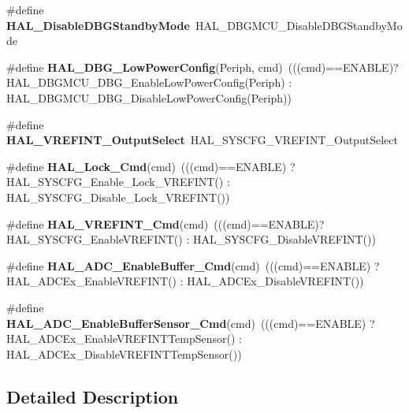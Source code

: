 \begin{DoxyCompactItemize}
\#define {\bfseries H\+A\+L\+\_\+\+Disable\+D\+B\+G\+Standby\+Mode}~H\+A\+L\+\_\+\+D\+B\+G\+M\+C\+U\+\_\+\+Disable\+D\+B\+G\+Standby\+Mode
\item 
\mbox{\label{group___h_a_l___aliased___functions_gaeece8fd3268534ce330c635222ce79a3}} 
\#define {\bfseries H\+A\+L\+\_\+\+D\+B\+G\+\_\+\+Low\+Power\+Config}(Periph,  cmd)~(((cmd)==E\+N\+A\+B\+LE)? H\+A\+L\+\_\+\+D\+B\+G\+M\+C\+U\+\_\+\+D\+B\+G\+\_\+\+Enable\+Low\+Power\+Config(Periph) \+: H\+A\+L\+\_\+\+D\+B\+G\+M\+C\+U\+\_\+\+D\+B\+G\+\_\+\+Disable\+Low\+Power\+Config(Periph))
\item 
\mbox{\label{group___h_a_l___aliased___functions_ga2c3d2cdc9071cfc99696e78c29621852}} 
\#define {\bfseries H\+A\+L\+\_\+\+V\+R\+E\+F\+I\+N\+T\+\_\+\+Output\+Select}~H\+A\+L\+\_\+\+S\+Y\+S\+C\+F\+G\+\_\+\+V\+R\+E\+F\+I\+N\+T\+\_\+\+Output\+Select
\item 
\mbox{\label{group___h_a_l___aliased___functions_ga72384357565be710258691efd3b3b72c}} 
\#define {\bfseries H\+A\+L\+\_\+\+Lock\+\_\+\+Cmd}(cmd)~(((cmd)==E\+N\+A\+B\+LE) ? H\+A\+L\+\_\+\+S\+Y\+S\+C\+F\+G\+\_\+\+Enable\+\_\+\+Lock\+\_\+\+V\+R\+E\+F\+I\+NT() \+: H\+A\+L\+\_\+\+S\+Y\+S\+C\+F\+G\+\_\+\+Disable\+\_\+\+Lock\+\_\+\+V\+R\+E\+F\+I\+NT())
\item 
\mbox{\label{group___h_a_l___aliased___functions_ga89195eed3652b3f7ce36e89f3cc8e3a6}} 
\#define {\bfseries H\+A\+L\+\_\+\+V\+R\+E\+F\+I\+N\+T\+\_\+\+Cmd}(cmd)~(((cmd)==E\+N\+A\+B\+LE)? H\+A\+L\+\_\+\+S\+Y\+S\+C\+F\+G\+\_\+\+Enable\+V\+R\+E\+F\+I\+NT() \+: H\+A\+L\+\_\+\+S\+Y\+S\+C\+F\+G\+\_\+\+Disable\+V\+R\+E\+F\+I\+NT())
\item 
\mbox{\label{group___h_a_l___aliased___functions_ga2945c26e7b184a3ee89309906de33cd3}} 
\#define {\bfseries H\+A\+L\+\_\+\+A\+D\+C\+\_\+\+Enable\+Buffer\+\_\+\+Cmd}(cmd)~(((cmd)==E\+N\+A\+B\+LE) ? H\+A\+L\+\_\+\+A\+D\+C\+Ex\+\_\+\+Enable\+V\+R\+E\+F\+I\+NT() \+: H\+A\+L\+\_\+\+A\+D\+C\+Ex\+\_\+\+Disable\+V\+R\+E\+F\+I\+NT())
\item 
\mbox{\label{group___h_a_l___aliased___functions_ga674bce235a7be59ff19cca605b2e3ce8}} 
\#define {\bfseries H\+A\+L\+\_\+\+A\+D\+C\+\_\+\+Enable\+Buffer\+Sensor\+\_\+\+Cmd}(cmd)~(((cmd)==E\+N\+A\+B\+LE) ?  H\+A\+L\+\_\+\+A\+D\+C\+Ex\+\_\+\+Enable\+V\+R\+E\+F\+I\+N\+T\+Temp\+Sensor() \+: H\+A\+L\+\_\+\+A\+D\+C\+Ex\+\_\+\+Disable\+V\+R\+E\+F\+I\+N\+T\+Temp\+Sensor())
\end{DoxyCompactItemize}


\subsection{Detailed Description}
